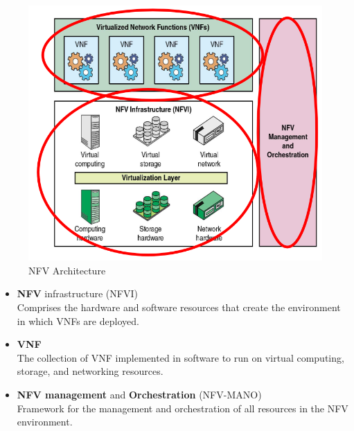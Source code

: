 \colfill
\begin{paracol}{2}
   \begin{figure}[htbp]
      \centering
   \includegraphics{images/NFV_architecture.png}
   \caption{NFV Architecture}
   \label{fig:NFV_architecture}
\end{figure}
\colfill

\switchcolumn
\colfill
\begin{itemize}
   \item \textbf{NFV} infrastructure (NFVI)\\
   Comprises the hardware and software resources that create the environment in which VNFs are deployed.
   \item \textbf{VNF}\\ 
   The collection of VNF implemented in software to run on virtual computing, storage, and networking resources.
   \item \textbf{NFV management} and \textbf{Orchestration} (NFV-MANO)\\
   Framework for the management and orchestration of all resources in the NFV environment.
\end{itemize}
\colfill
\end{paracol}

